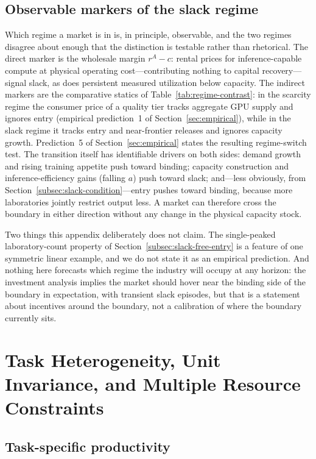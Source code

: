 \documentclass[11pt]{article}
\begin{document}
\subsection{Observable markers of the slack regime}
\label{subsec:slack-empirics}

Which regime a market is in is, in principle, observable, and the two regimes disagree about enough that the distinction is testable rather than rhetorical. The direct marker is the wholesale margin $r^{A}-c$: rental prices for inference-capable compute at physical operating cost---contributing nothing to capital recovery---signal slack, as does persistent measured utilization below capacity. The indirect markers are the comparative statics of Table~\ref{tab:regime-contrast}: in the scarcity regime the consumer price of a quality tier tracks aggregate GPU supply and ignores entry (empirical prediction~1 of Section~\ref{sec:empirical}), while in the slack regime it tracks entry and near-frontier releases and ignores capacity growth. Prediction~5 of Section~\ref{sec:empirical} states the resulting regime-switch test. The transition itself has identifiable drivers on both sides: demand growth and rising training appetite push toward binding; capacity construction and inference-efficiency gains (falling $a$) push toward slack; and---less obviously, from Section~\ref{subsec:slack-condition}---entry pushes toward binding, because more laboratories jointly restrict output less. A market can therefore cross the boundary in either direction without any change in the physical capacity stock.

Two things this appendix deliberately does not claim. The single-peaked laboratory-count property of Section~\ref{subsec:slack-free-entry} is a feature of one symmetric linear example, and we do not state it as an empirical prediction. And nothing here forecasts which regime the industry will occupy at any horizon: the investment analysis implies the market should hover near the binding side of the boundary in expectation, with transient slack episodes, but that is a statement about incentives around the boundary, not a calibration of where the boundary currently sits.

\section{Task Heterogeneity, Unit Invariance, and Multiple Resource Constraints}
\label{app:extensions}

\subsection{Task-specific productivity}
\end{document}
